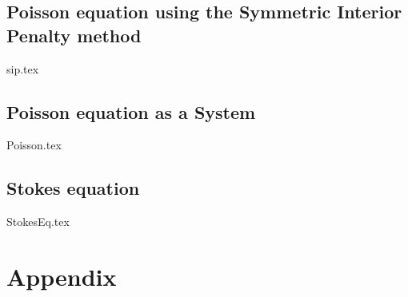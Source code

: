 \documentclass[a4paper,10pt]{report} %
\begin{document}




\chapter{Poisson equation using the Symmetric Interior Penalty method}
\label{sec:SIP}
{sip.tex}

\chapter{Poisson equation as a System}
\label{sec:PoissonAsASystem}
{Poisson.tex}

\chapter{Stokes equation}
\label{sec:Stokes}
{StokesEq.tex}



\part{Appendix}
\appendix
\end{document}
